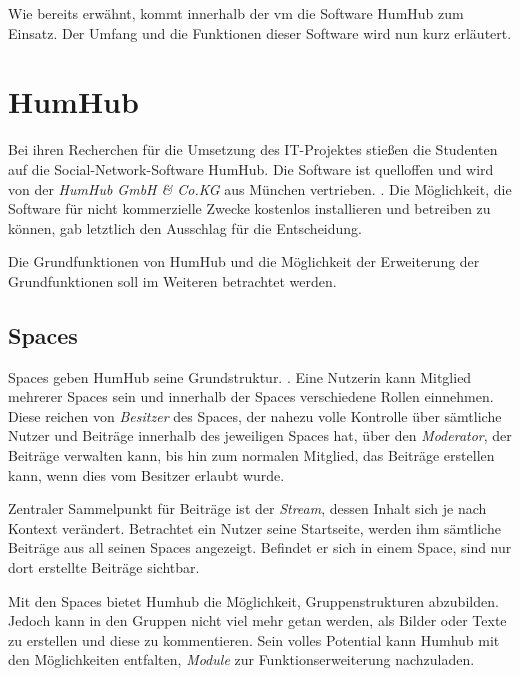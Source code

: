 Wie bereits erwähnt, kommt innerhalb der \ac{vm} die Software HumHub zum Einsatz. Der Umfang und die Funktionen dieser Software wird nun kurz erläutert.

\section{HumHub}

Bei ihren Recherchen für die Umsetzung des IT-Projektes stießen die Studenten auf die Social-Network-Software HumHub. Die Software ist quelloffen und wird von der \textit{HumHub GmbH \& Co.KG} aus München vertrieben. 
 \citep{humhubmain}.
Die Möglichkeit, die Software für nicht kommerzielle Zwecke kostenlos installieren und betreiben zu können, gab letztlich den Ausschlag für die Entscheidung.


Die Grundfunktionen von HumHub und die Möglichkeit der Erweiterung der Grundfunktionen soll im Weiteren betrachtet werden.

\subsection{Spaces}

Spaces geben HumHub seine Grundstruktur.  \citep{spaces}. 
Eine Nutzerin kann Mitglied mehrerer Spaces sein und innerhalb der Spaces verschiedene Rollen einnehmen. 
Diese reichen von \textit{Besitzer} des Spaces, der nahezu volle Kontrolle über sämtliche Nutzer und Beiträge innerhalb des jeweiligen Spaces hat, über den \textit{Moderator}, der Beiträge verwalten kann, bis hin zum normalen Mitglied, das Beiträge erstellen kann, wenn dies vom Besitzer erlaubt wurde.  

Zentraler Sammelpunkt für Beiträge ist der \textit{Stream}, dessen Inhalt sich je nach Kontext verändert. Betrachtet ein Nutzer seine Startseite, werden ihm sämtliche Beiträge aus all seinen Spaces angezeigt. 
Befindet er sich in einem Space, sind nur dort erstellte Beiträge sichtbar.

Mit den Spaces bietet Humhub die Möglichkeit, Gruppenstrukturen abzubilden. 
Jedoch kann in den Gruppen nicht viel mehr getan werden, als Bilder oder Texte zu erstellen und diese zu kommentieren.
Sein volles Potential kann Humhub mit den Möglichkeiten entfalten, \textit{Module} zur Funktionserweiterung nachzuladen.

